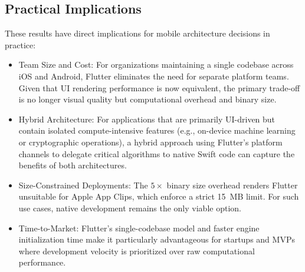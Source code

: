 \documentclass[journal]{IEEEtran}
\begin{document}
\subsection{Practical Implications}
These results have direct implications for mobile architecture decisions in practice:

\begin{itemize}
	\item Team Size and Cost: For organizations maintaining a single codebase across iOS and Android, Flutter eliminates the need for separate platform teams. Given that UI rendering performance is now equivalent, the primary trade-off is no longer visual quality but computational overhead and binary size.
	\item Hybrid Architecture: For applications that are primarily UI-driven but contain isolated compute-intensive features (e.g., on-device machine learning or cryptographic operations), a hybrid approach using Flutter's platform channels to delegate critical algorithms to native Swift code can capture the benefits of both architectures.
	\item Size-Constrained Deployments: The $5\times$ binary size overhead renders Flutter unsuitable for Apple App Clips, which enforce a strict 15~MB limit. For such use cases, native development remains the only viable option.
	\item Time-to-Market: Flutter's single-codebase model and faster engine initialization time make it particularly advantageous for startups and MVPs where development velocity is prioritized over raw computational performance.
\end{itemize}
\end{document}
